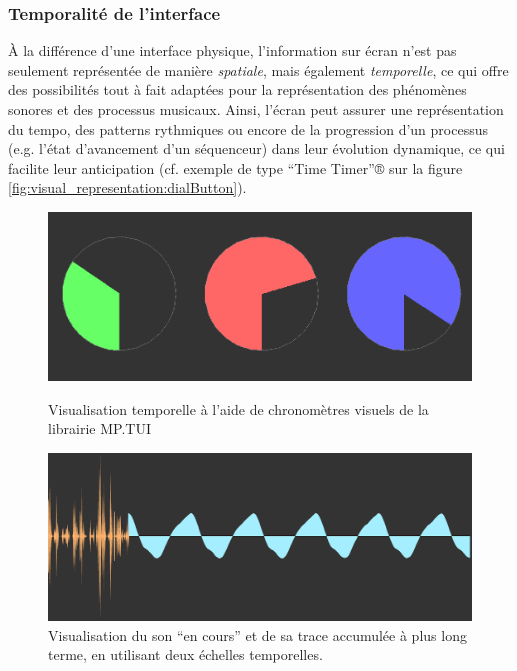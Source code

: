 \subsubsection{Temporalité de l'interface} 

\noindent À la différence d'une interface physique, l'information sur écran n'est pas seulement représentée de manière \textit{spatiale}, mais également \textit{temporelle}, ce qui offre des possibilités tout à fait adaptées pour la représentation des phénomènes sonores et des processus musicaux. Ainsi, l'écran peut assurer une représentation du tempo, des patterns rythmiques ou encore de la progression d'un processus (e.g. l'état d'avancement d'un séquenceur) dans leur évolution dynamique, ce qui facilite leur anticipation (cf. exemple de type ``Time Timer''® sur la figure \ref{fig:visual_representation:dialButton}).\\
\begin{figure}[!htbp]
	\captionsetup{format=plain}%
	\centering
	\begin{minipage}[t]{0.48\textwidth}
		\includegraphics[width=\linewidth]{gfx/06_visual_representation/mpTUI-DialButton.png}
		\caption[Visualisation temporelle à l'aide de chronomètres visuels]{Visualisation temporelle à l'aide de chronomètres visuels de la librairie MP.TUI}
		\label{fig:visual_representation:dialButton}
	\end{minipage}
	\hspace{.02\linewidth}
	\begin{minipage}[t]{0.48\textwidth}
	    \includegraphics[width=\linewidth]{gfx/06_visual_representation/LAM-DSW.png}
		\caption[Deux échelles temporelles différentes d'un flux audio]{Visualisation du son ``en cours'' et de sa trace accumulée à plus long terme, en utilisant deux échelles temporelles.}
		\label{fig:visual_representation:DSW}
	\end{minipage}
\end{figure}
